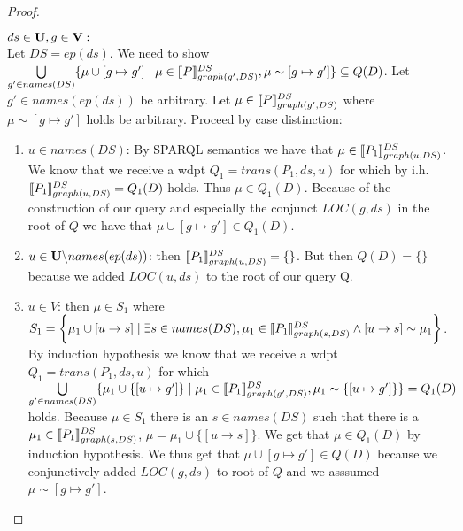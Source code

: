 \begin{proof}
\begin{enumerate}
			\bigskip\noindent
			$ds \in \mathbf{U}, g \in \mathbf{V}:$ \\ Let $DS = ep(ds)$.
			We need to show 
			$\bigcup\limits_{g' \in names(DS)} \{ \mu \cup [g\mapsto g'] \mid \mu \in
				\llbracket P \rrbracket^{DS}_{graph(g',DS)}, \mu \sim
			[g\mapsto g'] \}  \subseteq Q(D) $.
			Let  $g' \in names(ep(ds))$ be arbitrary.
			Let $\mu \in \llbracket P \rrbracket^{DS}_{graph(g',DS)}$ where $\mu \sim [g
			\mapsto g']$ holds be arbitrary.
			Proceed by case distinction:
			\begin{enumerate}
				\item $u \in names(DS)$:
					By SPARQL semantics we have that $\mu \in \llbracket P_1
					\rrbracket^{DS}_{graph(u,DS)}$.
					We know that we receive a wdpt $Q_1	= trans(P_1,ds,u)$ 
					for which by i.h.
					$\llbracket P_1 \rrbracket^{DS}_{graph(u,DS)} = Q_1(D)$ holds. Thus $\mu
					\in Q_1(D)$.
					Because of the construction of our query and especially the
					conjunct $LOC(g,ds)$ in the root of $Q$ we have that 
					$\mu \cup [g\mapsto g'] \in Q_1(D)$.

				\item $u \in \mathbf{U} \backslash names(ep(ds))$:
					then $\llbracket P_1 \rrbracket^{DS}_{graph(u,DS)} = \{\}$. But then
					$Q(D) = \{\}$ because we added $LOC(u,ds)$ to the root of
					our query Q.
				\item $u \in V$:
					then $\mu \in S_1$ where $S_1 =  \bigg\{\mu_1 \cup [ u \rightarrow s ] \mid
						\exists s \in names(DS), \mu_1 \in \llbracket P_1
						\rrbracket^{DS}_{graph(s,DS)} \land [ u \rightarrow s ] \sim
					\mu_1 \bigg\}$. 
					By induction hypothesis we know that we receive a wdpt $Q_1
					= trans(P_1,ds,u)$ for which\\ $\bigcup\limits_{g'\in names(DS)} 
					\{ \mu_1 \cup \{[u\mapsto g']\} \mid 
						\mu_1 \in \llbracket P_1 \rrbracket^{DS}_{graph(g',DS)}, 
					\mu_1 \sim \{[u \mapsto g']\}\} = Q_1(D)$ holds. Because $\mu \in S_1$ there
					is an $s \in names(DS)$ such  that there is a $\mu_1 \in \llbracket P_1
					\rrbracket^{DS}_{graph(s,DS)}$, 
					$\mu = \mu_1 \cup \{[u \rightarrow s]\}$. 
					We get that $\mu \in Q_1(D)$ by induction hypothesis. 
					We thus get that $\mu\cup[g\mapsto g'] \in Q(D)$ because we
					conjunctively added $LOC(g,ds)$ to root of $Q$ and we
					asssumed $\mu \sim [g\mapsto g']$.
			\end{enumerate}


\end{enumerate}
\end{proof}
